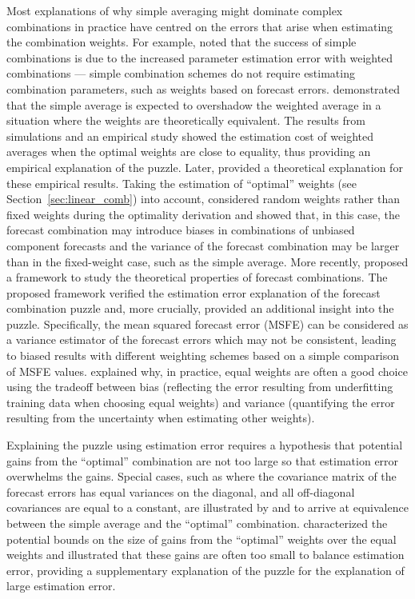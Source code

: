 \documentclass[a4paper,11pt]{article}
\begin{document}
Most explanations of why simple averaging might dominate complex combinations in practice have centred on the errors that arise when estimating the combination weights. For example, \citet{Timmermann2006-en} noted that the success of simple combinations is due to the increased parameter estimation error with weighted combinations --- simple combination schemes do not require estimating combination parameters, such as weights based on forecast errors. \citet{Smith2009-wd} demonstrated that the simple average is expected to overshadow the weighted average in a situation where the weights are theoretically equivalent. The results from simulations and an empirical study showed the estimation cost of weighted averages when the optimal weights are close to equality, thus providing an empirical explanation of the puzzle. Later, \citet{Claeskens2016-pv} provided a theoretical explanation for these empirical results. Taking the estimation of ``optimal'' weights (see Section~\ref{sec:linear_comb}) into account, \citet{Claeskens2016-pv} considered random weights rather than fixed weights during the optimality derivation and showed that, in this case, the forecast combination may introduce biases in combinations of unbiased component forecasts and the variance of the forecast combination may be larger than in the fixed-weight case, such as the simple average. More recently, \citet{Chan2018-jl} proposed a framework to study the theoretical properties of forecast combinations. The proposed framework verified the estimation error explanation of the forecast combination puzzle and, more crucially, provided an additional insight into the puzzle. Specifically, the mean squared forecast error (MSFE) can be considered as a variance estimator of the forecast errors which may not be consistent, leading to biased results with different weighting schemes based on a simple comparison of MSFE values. \citet{Blanc2020-pg} explained why, in practice, equal weights are often a good choice using the tradeoff between bias (reflecting the error resulting from underfitting training data when choosing equal weights) and variance (quantifying the error resulting from the uncertainty when estimating other weights).

Explaining the puzzle using estimation error requires a hypothesis that potential gains from the ``optimal'' combination are not too large so that estimation error overwhelms the gains. Special cases, such as where the covariance matrix of the forecast errors has equal variances on the diagonal, and all off-diagonal covariances are equal to a constant, are illustrated by \citet{Timmermann2006-en} and \citet{Hsiao2014-ug} to arrive at equivalence between the simple average and the ``optimal'' combination. \citet{Elliott2011-ab} characterized the potential bounds on the size of gains from the ``optimal'' weights over the equal weights and illustrated that these gains are often too small to balance estimation error, providing a supplementary explanation of the puzzle for the explanation of large estimation error.
\end{document}
